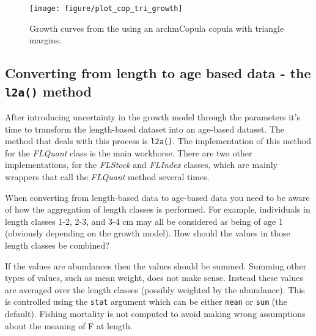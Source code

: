 \documentclass[a4paper,english,10pt]{article}\usepackage[]{graphicx}\usepackage[]{color}
\makeatletter
\newenvironment{kframe}{%
 \def\at@end@of@kframe{}%
 \ifinner\ifhmode%
  \def\at@end@of@kframe{\end{minipage}}%
  \begin{minipage}{\columnwidth}%
 \fi\fi%
 \def\FrameCommand##1{\hskip\@totalleftmargin \hskip-\fboxsep
 \colorbox{shadecolor}{##1}\hskip-\fboxsep
     \hskip-\linewidth \hskip-\@totalleftmargin \hskip\columnwidth}%
 \MakeFramed {\advance\hsize-\width
   \@totalleftmargin\z@ \linewidth\hsize
   \@setminipage}}%
 {\par\unskip\endMakeFramed%
 \at@end@of@kframe}
\newenvironment{knitrout}{}{} %
\newcommand{\code}[1]{{\texttt{#1}}}
\newcommand{\class}[1]{{\textit{#1}}}
\makeatother
\begin{document}
\begin{knitrout}
\color{fgcolor}\begin{kframe}


{\ttfamily\noindent\bfseries\color{errorcolor}{\#\# Error: need finite 'ylim' values}}\end{kframe}\begin{figure}[H]


{\centering \texttt{[image: figure/plot\_cop\_tri\_growth]} 

}

\caption[Growth curves from the using an archmCopula copula with triangle margins]{Growth curves from the using an archmCopula copula with triangle margins.\label{fig:plot_cop_tri_growth}}
\end{figure}


\end{knitrout}

\subsection{Converting from length to age based data - the \code{l2a()} method}

After introducing uncertainty in the growth model through the parameters it's time to transform the length-based dataset into an age-based dataset. The method that deals with this process is \code{l2a()}. The implementation of this method for the \class{FLQuant} class is the main workhorse. There are two other implementations, for the \class{FLStock} and \class{FLIndex} classes, which are mainly wrappers that call the \class{FLQuant} method several times.

When converting from length-based data to age-based data you need to be aware of how the aggregation of length classes is performed. For example, individuals in length classes 1-2, 2-3, and 3-4 cm may all be considered as being of age 1 (obviously depending on the growth model). How should the values in those length classes be combined?

If the values are abundances then the values should be summed. Summing other types of values, such as mean weight, does not make sense. Instead these values are averaged over the length classes (possibly weighted by the abundance). This is controlled using the \code{stat} argument which can be either \code{mean} or \code{sum} (the default). Fishing mortality is not computed to avoid making wrong assumptions about the meaning of F at length.
\end{document}
